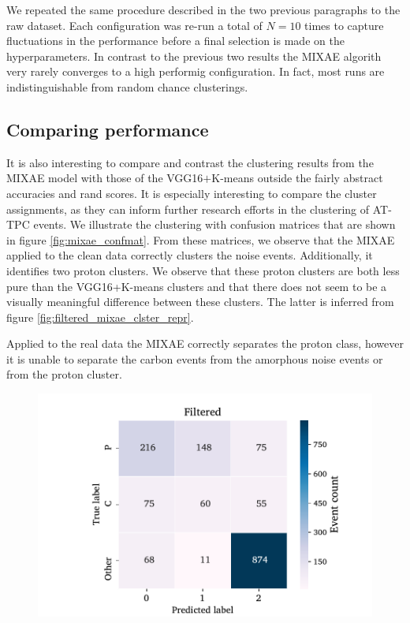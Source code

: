 \documentclass[review,number,sort&compress]{elsarticle}
\begin{document}
We repeated the same procedure described in the two previous paragraphs to the raw dataset. Each configuration was re-run a total of $N=10$ times to capture fluctuations in the performance before a final selection is made on the hyperparameters. In contrast to the previous two results the MIXAE algorith very rarely converges to a high performig configuration. In fact, most runs are indistinguishable from random chance clusterings.

\subsection{Comparing performance}

It is also interesting to compare and contrast the clustering results from the MIXAE model with those of the VGG16$+$K-means outside the fairly abstract accuracies and rand scores. It is especially interesting to compare the cluster assignments, as they can inform further research efforts in the clustering of AT-TPC events. We illustrate the clustering with confusion matrices that are shown in figure \ref{fig:mixae_confmat}. From these matrices, we observe that the MIXAE applied to the clean data correctly clusters the noise events. Additionally, it identifies two proton clusters. We observe that these proton clusters are both less pure than the VGG16+K-means clusters and that there does not seem to be a visually meaningful difference between these clusters. The latter is inferred from figure \ref{fig:filtered_mixae_clster_repr}. 

Applied to the real data the MIXAE correctly separates the proton class, however it is unable to separate the carbon events from the amorphous noise events or from the proton cluster. 

\begin{figure}[H]
\centering
	\includegraphics[width=\textwidth]{custom_work/Filtered_mixae_conf_mat.pdf}
\end{figure}
\end{document}
